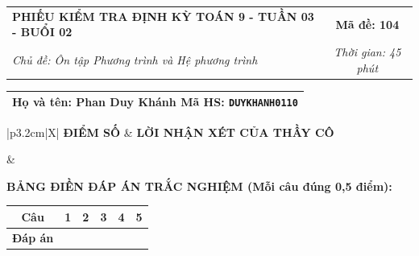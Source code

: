 \documentclass[12pt,a4paper]{article}
\begin{document}
\newpage


\noindent
\begin{tabularx}{\linewidth}{|X|c|}
\hline
\textbf{PHIẾU KIỂM TRA ĐỊNH KỲ TOÁN 9 - TUẦN 03 - BUỔI 02} & \textbf{Mã đề: 104} \\
\textit{Chủ đề: Ôn tập Phương trình và Hệ phương trình} & \textit{Thời gian: 45 phút} \\
\hline
\end{tabularx}

\vspace{1mm}

\noindent
\begin{tabularx}{\linewidth}{|X|}
\hline
\rule[-2mm]{0pt}{7.5mm}\textbf{Họ và tên:} \textbf{\large Phan Duy Khánh} \hfill \textbf{Mã HS:} \texttt{DUYKHANH0110} \quad \\
\hline
\end{tabularx}

\vspace{1mm}

\noindent
\begin{tabularx}{\linewidth}{|p{3.2cm}|X|}
\hline
\centering\textbf{ĐIỂM SỐ} & \centering\textbf{LỜI NHẬN XÉT CỦA THẦY CÔ} \tabularnewline
\hline
\rule{0pt}{1.3cm} & \tabularnewline
\hline
\end{tabularx}

\vspace{1.2mm}

\noindent\textbf{BẢNG ĐIỀN ĐÁP ÁN TRẮC NGHIỆM (Mỗi câu đúng 0,5 điểm):}
\vspace{0.8mm}

\noindent
\renewcommand{\arraystretch}{1.35}
\begin{tabularx}{\linewidth}{|c|*{5}{>{\centering\arraybackslash}X|}}
\hline
\textbf{Câu} & \textbf{1} & \textbf{2} & \textbf{3} & \textbf{4} & \textbf{5} \\
\hline
\textbf{Đáp án} & & & & & \\
\hline
\end{tabularx}
\renewcommand{\arraystretch}{1.0}

\vspace{1.5mm}
\end{document}
